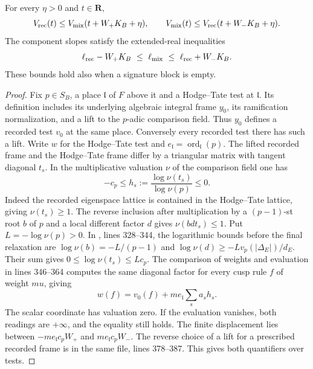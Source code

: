 \begin{proposition}\label{mixrec:change}
For every \(\eta>0\) and \(t\in\mathbf R\),
\[
     V_{\rm rec}(t)\le V_{\rm mix}(t+W_+K_B+\eta),\qquad
     V_{\rm mix}(t)\le V_{\rm rec}(t+W_-K_B+\eta).
\]
The component slopes satisfy the extended-real inequalities
\[
           \ell_{\rm rec}-W_+K_B
                  \ \le\ \ell_{\rm mix}\
                  \le\ \ell_{\rm rec}+W_-K_B .
\]
These bounds hold also when a signature block is empty.
\end{proposition}
\begin{proof}
Fix \(p\in S_B\), a place \(\mathfrak l\) of \(F\) above it and a
Hodge--Tate test at \(\mathfrak l\). Its definition includes its
underlying algebraic integral frame \(y_0\), its ramification
normalization, and a lift to the \(p\)-adic comparison field. Thus
\(y_0\) defines a recorded test \(v_0\) at the same place. Conversely
every recorded test there has such a lift. Write \(w\) for the
Hodge--Tate test and \(e_{\mathfrak l}=\operatorname{ord}_{\mathfrak l}(p)\).
The lifted recorded frame and the Hodge--Tate frame differ by a
triangular matrix with tangent diagonal \(t_s\). In the multiplicative
valuation \(\nu\) of the comparison field one has
\[
       -c_p\le h_s:=\frac{\log\nu(t_s)}{\log\nu(p)}\le0 .
\]
Indeed the recorded eigenspace lattice is contained in the
Hodge--Tate lattice, giving \(\nu(t_s)\ge1\). The reverse inclusion
after multiplication by a \((p-1)\)-st root \(b\) of \(p\) and a
local different factor \(d\) gives \(\nu(bdt_s)\le1\). Put
\(L=-\log\nu(p)>0\). In , lines 328--344,
the logarithmic bounds before the final relaxation are
\(\log\nu(b)=-L/(p-1)\) and
\(\log\nu(d)\ge-Lv_p(|\Delta_E|)/d_E\). Their sum gives
\(0\le\log\nu(t_s)\le Lc_p\). The comparison of weights
and evaluation in lines 346--364 computes the same diagonal factor
for every cusp rule \(f\) of weight \(mu\), giving
\[
             w(f)=v_0(f)+m e_{\mathfrak l}\sum_s a_s h_s .
\]
The scalar coordinate has valuation zero. If the evaluation vanishes,
both readings are \(+\infty\), and the equality still holds. The
finite displacement lies between \(-m e_{\mathfrak l}c_pW_+\) and
\(m e_{\mathfrak l}c_pW_-\). The reverse choice of a lift for a
prescribed recorded frame is  in the same file,
lines 378--387. This gives both quantifiers over tests.


\end{proof}
